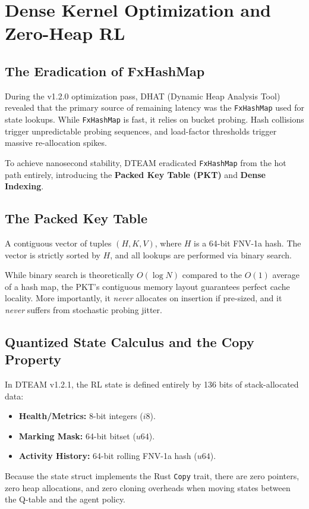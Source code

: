 \chapter{Dense Kernel Optimization and Zero-Heap RL}
\section{The Eradication of FxHashMap}
During the v1.2.0 optimization pass, DHAT (Dynamic Heap Analysis Tool) revealed that the primary source of remaining latency was the \texttt{FxHashMap} used for state lookups. While \texttt{FxHashMap} is fast, it relies on bucket probing. Hash collisions trigger unpredictable probing sequences, and load-factor thresholds trigger massive re-allocation spikes.

To achieve nanosecond stability, DTEAM eradicated \texttt{FxHashMap} from the hot path entirely, introducing the \textbf{Packed Key Table (PKT)} and \textbf{Dense Indexing}.

\section{The Packed Key Table}
\begin{definition}
A contiguous vector of tuples $(H, K, V)$, where $H$ is a 64-bit FNV-1a hash. The vector is strictly sorted by $H$, and all lookups are performed via binary search.
\end{definition}

While binary search is theoretically $O(\log N)$ compared to the $O(1)$ average of a hash map, the PKT's contiguous memory layout guarantees perfect cache locality. More importantly, it \textit{never} allocates on insertion if pre-sized, and it \textit{never} suffers from stochastic probing jitter.

\section{Quantized State Calculus and the Copy Property}
In DTEAM v1.2.1, the RL state is defined entirely by 136 bits of stack-allocated data:
\begin{itemize}
    \item \textbf{Health/Metrics:} 8-bit integers ($i8$).
    \item \textbf{Marking Mask:} 64-bit bitset ($u64$).
    \item \textbf{Activity History:} 64-bit rolling FNV-1a hash ($u64$).
\end{itemize}
Because the state struct implements the Rust \texttt{Copy} trait, there are zero pointers, zero heap allocations, and zero cloning overheads when moving states between the Q-table and the agent policy.

